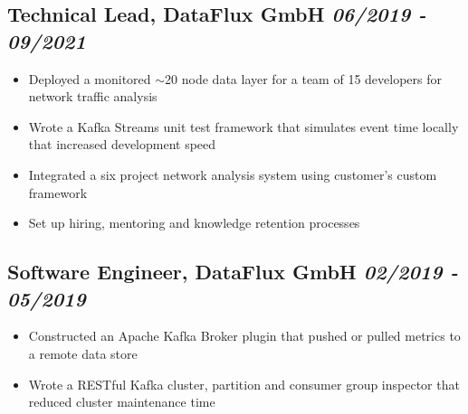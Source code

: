 \documentclass[a4paper]{article}
\newcommand{\bolditalicpair}
[2]
{\textbf{#1} \texorpdfstring{\hfill}{} \textit{#2}}
\begin{document}
\subsection{\bolditalicpair{Technical Lead, DataFlux GmbH}{06/2019 - 09/2021}}

\begin{itemize}
 \item Deployed a monitored $\sim$20 node data layer for a team of 15 developers for network traffic analysis
 \item Wrote a Kafka Streams unit test framework that simulates event time locally that increased development speed
 \item Integrated a six project network analysis system using customer's custom framework
 \item Set up hiring, mentoring and knowledge retention processes
\end{itemize}

\subsection{\bolditalicpair{Software Engineer, DataFlux GmbH}{02/2019 - 05/2019}}

\begin{itemize}
  \item Constructed an Apache Kafka Broker plugin that pushed or pulled metrics to a remote data store
  \item Wrote a RESTful Kafka cluster, partition and consumer group inspector that reduced cluster maintenance time
\end{itemize}


\end{document}
